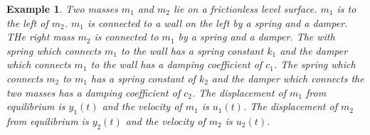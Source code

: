 \documentclass[11pt]{book}
\theoremstyle{example}
\newtheorem{example}{Example}[section]
\begin{document}
\begin{example}

Two masses $m_1$ and $m_2$ lie on a frictionless level surface. $m_1$ is to the left of $m_2$. $m_1$ is connected to a wall on the left by a spring and a damper. THe right mass $m_2$ is connected to $m_1$ by a spring and a damper. The with spring which connects $m_1$ to the wall has a spring constant $k_1$ and the damper which connects  $m_1$ to the wall has a damping coefficient of $c_1$. The spring which connects $m_2$ to $m_1$ has a spring constant of $k_2$ and the damper which connects the two masses has a damping coefficient of $c_2$. The displacement of $m_1$ from equilibrium is $y_1(t)$ and the velocity of $m_1$ is $u_1(t)$. The displacement of $m_2$ from equilibrium is $y_2(t)$ and the velocity of $m_2$ is $u_2(t)$. 


\end{example}
\end{document}
